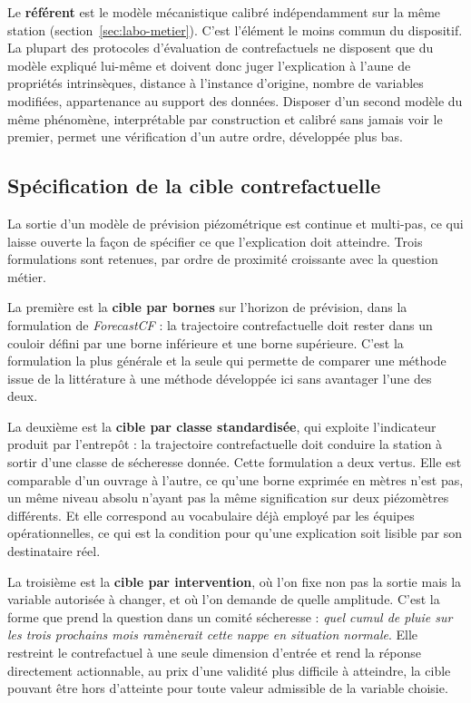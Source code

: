 Le \textbf{référent} est le modèle mécanistique calibré indépendamment sur la même station (section~\ref{sec:labo-metier}). C'est l'élément le moins commun du dispositif. La plupart des protocoles d'évaluation de contrefactuels ne disposent que du modèle expliqué lui-même et doivent donc juger l'explication à l'aune de propriétés intrinsèques, distance à l'instance d'origine, nombre de variables modifiées, appartenance au support des données. Disposer d'un second modèle du même phénomène, interprétable par construction et calibré sans jamais voir le premier, permet une vérification d'un autre ordre, développée plus bas.

\subsection{Spécification de la cible contrefactuelle}

La sortie d'un modèle de prévision piézométrique est continue et multi-pas, ce qui laisse ouverte la façon de spécifier ce que l'explication doit atteindre. Trois formulations sont retenues, par ordre de proximité croissante avec la question métier.

La première est la \textbf{cible par bornes} sur l'horizon de prévision, dans la formulation de \textit{ForecastCF} \cite{wang2023forecastcf} : la trajectoire contrefactuelle doit rester dans un couloir défini par une borne inférieure et une borne supérieure. C'est la formulation la plus générale et la seule qui permette de comparer une méthode issue de la littérature à une méthode développée ici sans avantager l'une des deux.

La deuxième est la \textbf{cible par classe standardisée}, qui exploite l'indicateur produit par l'entrepôt : la trajectoire contrefactuelle doit conduire la station à sortir d'une classe de sécheresse donnée. Cette formulation a deux vertus. Elle est comparable d'un ouvrage à l'autre, ce qu'une borne exprimée en mètres n'est pas, un même niveau absolu n'ayant pas la même signification sur deux piézomètres différents. Et elle correspond au vocabulaire déjà employé par les équipes opérationnelles, ce qui est la condition pour qu'une explication soit lisible par son destinataire réel.

La troisième est la \textbf{cible par intervention}, où l'on fixe non pas la sortie mais la variable autorisée à changer, et où l'on demande de quelle amplitude. C'est la forme que prend la question dans un comité sécheresse : \emph{quel cumul de pluie sur les trois prochains mois ramènerait cette nappe en situation normale}. Elle restreint le contrefactuel à une seule dimension d'entrée et rend la réponse directement actionnable, au prix d'une validité plus difficile à atteindre, la cible pouvant être hors d'atteinte pour toute valeur admissible de la variable choisie.

